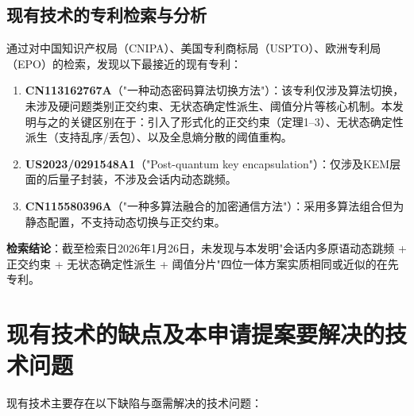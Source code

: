 ﻿\documentclass[12pt,a4paper]{article}
\begin{document}
\subsection{现有技术的专利检索与分析}

通过对中国知识产权局（CNIPA）、美国专利商标局（USPTO）、欧洲专利局（EPO）的检索，发现以下最接近的现有专利：

\begin{enumerate}[label=(\arabic*)]
    \item \textbf{CN113162767A}（"一种动态密码算法切换方法"）：该专利仅涉及算法切换，未涉及硬问题类别正交约束、无状态确定性派生、阈值分片等核心机制。本发明与之的关键区别在于：引入了形式化的正交约束（定理1--3）、无状态确定性派生（支持乱序/丢包）、以及全息熵分散的阈值重构。
    \item \textbf{US2023/0291548A1}（"Post-quantum key encapsulation"）：仅涉及KEM层面的后量子封装，不涉及会话内动态跳频。
    \item \textbf{CN115580396A}（"一种多算法融合的加密通信方法"）：采用多算法组合但为静态配置，不支持动态切换与正交约束。
\end{enumerate}

\textbf{检索结论}：截至检索日2026年1月26日，未发现与本发明"会话内多原语动态跳频 + 正交约束 + 无状态确定性派生 + 阈值分片"四位一体方案实质相同或近似的在先专利。

\section{现有技术的缺点及本申请提案要解决的技术问题}

现有技术主要存在以下缺陷与亟需解决的技术问题：
\end{document}

